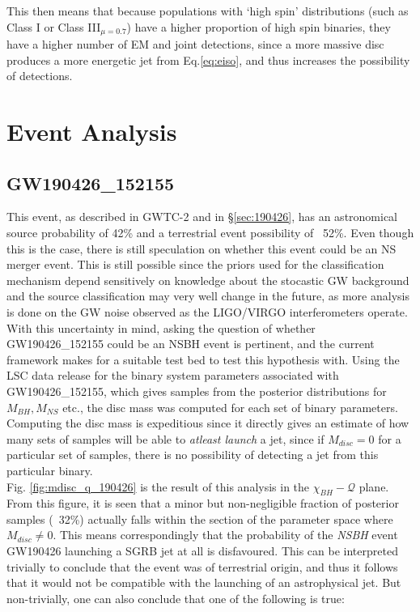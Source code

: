     This then means that because populations with `high spin' distributions (such as
    Class I or Class III$_{\mu = 0.7}$) have a higher proportion of high spin binaries,
    they have a higher number of EM and joint detections, since a more massive disc
    produces a more energetic jet from Eq.\ref{eq:eiso}, and thus increases the
    possibility of detections.

\section{Event Analysis}\label{sec:event_analysis}

    \subsection{GW190426\_152155}\label{ssec:nsbh_190426}

        This event, as described in GWTC-2 and in \S\ref{sec:190426}, has an
        astronomical source probability of 42\% and a terrestrial event possibility of
        ~52\%. Even though this is the case, there is still speculation on whether this
        event could be an NS merger event.  This is still possible since the priors used
        for the classification mechanism depend sensitively on knowledge about the
        stocastic GW background and the source classification may very well change in
        the future, as more analysis is done on the GW noise observed as the LIGO/VIRGO
        interferometers operate.\\
        With this uncertainty in mind, asking the question of whether GW190426\_152155
        could be an NSBH event is pertinent, and the current framework makes for a
        suitable test bed to test this hypothesis with. Using the LSC data release for
        the binary system parameters associated with GW190426\_152155, which gives
        samples from the posterior distributions for $M_{BH}, M_{NS}$ etc., the disc
        mass was computed for each set of binary parameters. Computing the disc mass is
        expeditious since it directly gives an estimate of how many sets of samples will
        be able to \textit{atleast launch} a jet, since if $M_{disc} = 0$ for a
        particular set of samples, there is no possibility of detecting a jet from this
        particular binary.\\
        Fig. \ref{fig:mdisc_q_190426} is the result of this analysis in the
        $\chi_{BH}-\mathcal{Q}$ plane. From this figure, it is seen that a minor but
        non-negligible fraction of posterior samples (~32\%) actually falls within the
        section of the parameter space where $M_{disc} \neq 0$. This means
        correspondingly that the probability of the \emph{NSBH} event GW190426 launching
        a SGRB jet at all is disfavoured. This can be interpreted trivially to conclude
        that the event was of terrestrial origin, and thus it follows that it would not
        be compatible with the launching of an astrophysical jet. But non-trivially, one
        can also conclude that one of the following is true:


